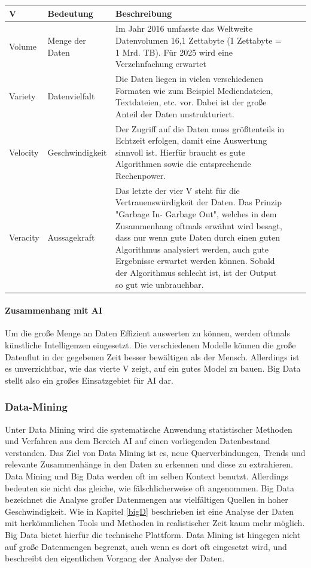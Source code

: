 \begin{center}
\label{tbl_bigdata}
\begin{tabular}{ |p{1.5cm} |p{3cm} | p{8.5cm}| c r }
\hline
V & Bedeutung &  Beschreibung\\
\hline
Volume & Menge der Daten &  Im Jahr 2016 umfasste das Weltweite Datenvolumen 16,1 Zettabyte (1 Zettabyte = 1 Mrd. TB). Für 2025 wird eine Verzehnfachung erwartet\\  
\hline
Variety & Datenvielfalt & Die Daten liegen in vielen verschiedenen Formaten wie zum Beispiel Mediendateien, Textdateien, etc. vor. Dabei ist der große Anteil der Daten unstrukturiert. \\
\hline
Velocity & Geschwindigkeit & Der Zugriff auf die Daten muss größtenteils in Echtzeit erfolgen, damit eine Auswertung sinnvoll ist. Hierfür braucht es gute Algorithmen sowie die entsprechende Rechenpower. \\ 
\hline
Veracity & Aussagekraft & Das letzte der vier V steht für die Vertrauenswürdigkeit der Daten. Das Prinzip "Garbage In- Garbage Out", welches in dem Zusammenhang oftmals erwähnt wird besagt, dass nur wenn gute Daten durch einen guten Algorithmus analysiert werden, auch gute Ergebnisse erwartet werden können. Sobald der Algorithmus schlecht ist, ist der Output so gut wie unbrauchbar. \\
\hline
\end{tabular}
\end{center}

\paragraph{Zusammenhang mit AI}
Um die große Menge an Daten Effizient auswerten zu können, werden oftmals künstliche Intelligenzen eingesetzt. Die verschiedenen Modelle können die große Datenflut in der gegebenen Zeit besser bewältigen als der Mensch. Allerdings ist es unverzichtbar, wie das vierte V zeigt, auf ein gutes Model zu bauen. Big Data stellt also ein großes Einsatzgebiet für AI dar.

\subsubsection{Data-Mining}
Unter Data Mining wird die systematische Anwendung statistischer Methoden und Verfahren aus dem Bereich AI auf einen vorliegenden Datenbestand verstanden. Das Ziel von Data Mining ist es, neue Querverbindungen, Trends und relevante Zusammenhänge in den Daten zu erkennen und diese zu extrahieren. Data Mining und Big Data werden oft im selben Kontext benutzt. Allerdings bedeuten sie nicht das gleiche, wie fälschlicherweise oft angenommen. Big Data bezeichnet die Analyse großer Datenmengen aus vielfältigen Quellen in hoher Geschwindigkeit. Wie in Kapitel \ref{bigD} beschrieben ist eine Analyse der Daten mit herkömmlichen Tools und Methoden in realistischer Zeit kaum mehr möglich. Big Data bietet hierfür die technische Plattform. Data Mining ist hingegen nicht auf große Datenmengen begrenzt, auch wenn es dort oft eingesetzt wird, und beschreibt den eigentlichen Vorgang der Analyse der Daten.

